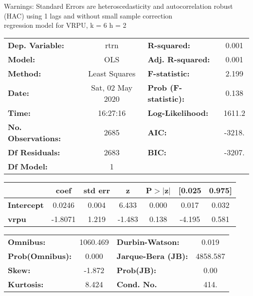 Warnings: \newline
 [1] Standard Errors are heteroscedasticity and autocorrelation robust (HAC) using 1 lags and without small sample correction\\ 

regression model for VRPU, k = 6 h = 2\begin{center}
\begin{tabular}{lclc}
\toprule
\textbf{Dep. Variable:}    &       rtrn       & \textbf{  R-squared:         } &     0.001   \\
\textbf{Model:}            &       OLS        & \textbf{  Adj. R-squared:    } &     0.001   \\
\textbf{Method:}           &  Least Squares   & \textbf{  F-statistic:       } &     2.199   \\
\textbf{Date:}             & Sat, 02 May 2020 & \textbf{  Prob (F-statistic):} &    0.138    \\
\textbf{Time:}             &     16:27:16     & \textbf{  Log-Likelihood:    } &    1611.2   \\
\textbf{No. Observations:} &        2685      & \textbf{  AIC:               } &    -3218.   \\
\textbf{Df Residuals:}     &        2683      & \textbf{  BIC:               } &    -3207.   \\
\textbf{Df Model:}         &           1      & \textbf{                     } &             \\
\bottomrule
\end{tabular}
\begin{tabular}{lcccccc}
                   & \textbf{coef} & \textbf{std err} & \textbf{z} & \textbf{P$> |$z$|$} & \textbf{[0.025} & \textbf{0.975]}  \\
\midrule
\textbf{Intercept} &       0.0246  &        0.004     &     6.433  &         0.000        &        0.017    &        0.032     \\
\textbf{vrpu}      &      -1.8071  &        1.219     &    -1.483  &         0.138        &       -4.195    &        0.581     \\
\bottomrule
\end{tabular}
\begin{tabular}{lclc}
\textbf{Omnibus:}       & 1060.469 & \textbf{  Durbin-Watson:     } &    0.019  \\
\textbf{Prob(Omnibus):} &   0.000  & \textbf{  Jarque-Bera (JB):  } & 4858.587  \\
\textbf{Skew:}          &  -1.872  & \textbf{  Prob(JB):          } &     0.00  \\
\textbf{Kurtosis:}      &   8.424  & \textbf{  Cond. No.          } &     414.  \\
\bottomrule
\end{tabular}
\end{center}

